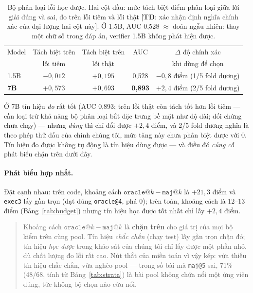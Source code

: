 \documentclass[11pt,a4paper]{article}
\newcommand{\todoTD}[1]{\textcolor{red!70!black}{[\textbf{TD}: #1]}}
\begin{document}
\begin{table}[t]\centering\small
\begin{tabular}{lcccc}\toprule
Model & Tách biệt trên & Tách biệt trên & AUC & $\Delta$ độ chính xác\\
 & lỗi tiêm & lỗi thật & & khi dùng để chọn\\\midrule
1.5B & $-0{,}012$ & $+0{,}195$ & 0,528 & $-0{,}8$ điểm (1/5 fold dương)\\
\textbf{7B} & $+0{,}573$ & $+0{,}693$ & \textbf{0,893} & $+2{,}4$ điểm (2/5 fold dương)\\\bottomrule
\end{tabular}
\caption{Bộ phân loại lỗi học được. Hai cột đầu: mức tách biệt điểm phân loại giữa lời giải
đúng và sai, đo trên lỗi tiêm và lỗi thật \todoTD{xác nhận định nghĩa chính xác của đại lượng
hai cột này}. Ở 1.5B, AUC 0,528 $\approx$ đoán ngẫu nhiên: thay một chữ số trong đáp án,
verifier 1.5B không phát hiện được.}
\label{tab:clf}
\end{table}

Ở 7B tín hiệu \emph{đo} rất tốt (AUC 0,893; trên lỗi thật còn tách tốt hơn lỗi tiêm --- cần
loại trừ khả năng bộ phân loại bắt đặc trưng bề mặt như độ dài; đối chứng chưa chạy) --- nhưng
\emph{dùng} thì chỉ đổi được $+2{,}4$ điểm, và 2/5 fold dương nghĩa là theo phép thử dấu của
chính chúng tôi, mức tăng này chưa phân biệt được với 0. Tín hiệu đo được không tự động là tín
hiệu dùng được --- và điều đó \emph{củng cố} phát biểu chặn trên dưới đây.

\paragraph{Phát biểu hợp nhất.} Đặt cạnh nhau: trên code, khoảng cách
$\texttt{oracle@}k-\texttt{maj@}k$ là $+21{,}3$ điểm và \texttt{exec3} lấy gần trọn (đạt đúng
\texttt{oracle@4}, phá 0); trên toán, khoảng cách là 12--13 điểm (Bảng~\ref{tab:budget}) nhưng
tín hiệu học được tốt nhất chỉ lấy $+2{,}4$ điểm.
\begin{quote}
Khoảng cách $\texttt{oracle@}k - \texttt{maj@}k$ là \textbf{chặn trên} cho giá trị của mọi bộ
kiểm trên cùng pool. Tín hiệu \emph{chắc chắn} (chạy test) lấy gần trọn chặn đó; tín hiệu
\emph{học được} trong khảo sát của chúng tôi chỉ lấy được một phần nhỏ, dù chất lượng đo lỗi
rất cao. Nút thắt của miền toán vì vậy kép: vừa thiếu tín hiệu chắc chắn, vừa nghèo pool ---
trong số bài mà \texttt{maj@5} sai, 71\% (48/68, tính từ Bảng~\ref{tab:strata}) là bài pool
không chứa nổi một ứng viên đúng, tức không bộ chọn nào cứu nổi.
\end{quote}
\end{document}
